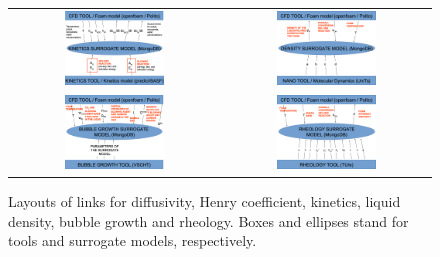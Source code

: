 \begin{figure}
\begin{tabular}{cc}
    \includegraphics[width=0.5\textwidth,keepaspectratio=true]{./Content/Figures/PU_exercise_4.eps} &
    \includegraphics[width=0.5\textwidth,keepaspectratio=true]{./Content/Figures/PU_exercise_5.eps} \\

    \includegraphics[width=0.5\textwidth,keepaspectratio=true]{./Content/Figures/PU_exercise_6.eps} &
    \includegraphics[width=0.5\textwidth,keepaspectratio=true]{./Content/Figures/PU_exercise_7.eps} \\
  \end{tabular}
  \caption{Layouts of links for diffusivity, Henry coefficient, kinetics, liquid
    density, bubble growth and rheology. Boxes and ellipses stand for tools and
    surrogate models, respectively.}
  \label{fig:links}
\end{figure}

